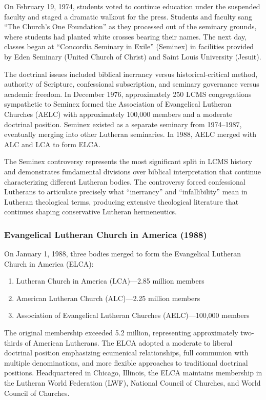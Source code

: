 On February 19, 1974, students voted to continue education under the suspended faculty and staged a dramatic walkout for the press. Students and faculty sang ``The Church's One Foundation'' as they processed out of the seminary grounds, where students had planted white crosses bearing their names. The next day, classes began at ``Concordia Seminary in Exile'' (Seminex) in facilities provided by Eden Seminary (United Church of Christ) and Saint Louis University (Jesuit).

The doctrinal issues included biblical inerrancy versus historical-critical method, authority of Scripture, confessional subscription, and seminary governance versus academic freedom. In December 1976, approximately 250 LCMS congregations sympathetic to Seminex formed the Association of Evangelical Lutheran Churches (AELC) with approximately 100,000 members and a moderate doctrinal position. Seminex existed as a separate seminary from 1974--1987, eventually merging into other Lutheran seminaries. In 1988, AELC merged with ALC and LCA to form ELCA.

The Seminex controversy represents the most significant split in LCMS history and demonstrates fundamental divisions over biblical interpretation that continue characterizing different Lutheran bodies. The controversy forced confessional Lutherans to articulate precisely what ``inerrancy'' and ``infallibility'' mean in Lutheran theological terms, producing extensive theological literature that continues shaping conservative Lutheran hermeneutics.

\subsubsection{Evangelical Lutheran Church in America (1988)}

On January 1, 1988, three bodies merged to form the Evangelical Lutheran Church in America (ELCA):

\begin{enumerate}
\item Lutheran Church in America (LCA)---2.85 million members
\item American Lutheran Church (ALC)---2.25 million members
\item Association of Evangelical Lutheran Churches (AELC)---100,000 members
\end{enumerate}

The original membership exceeded 5.2 million, representing approximately two-thirds of American Lutherans. The ELCA adopted a moderate to liberal doctrinal position emphasizing ecumenical relationships, full communion with multiple denominations, and more flexible approaches to traditional doctrinal positions. Headquartered in Chicago, Illinois, the ELCA maintains membership in the Lutheran World Federation (LWF), National Council of Churches, and World Council of Churches.

